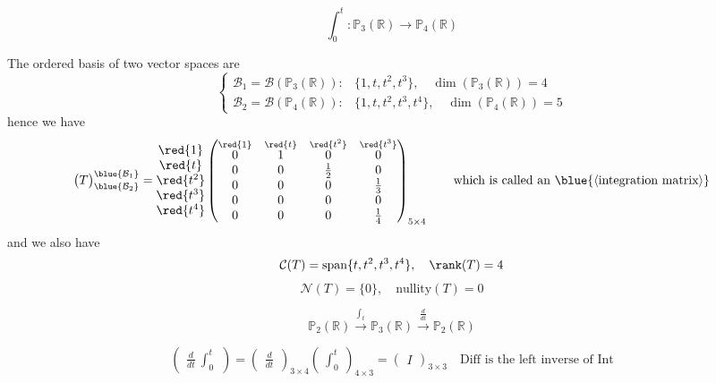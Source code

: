 \begin{eg}
    \[
        \int_0^t: \mathbb{P}_3(\mathbb{R}) \to \mathbb{P}_4(\mathbb{R})
    \]
\end{eg}
The ordered basis of two vector spaces are
\[
    \begin{cases}
        \mathcal{B}_1 = \mathcal{B}(\mathbb{P}_3(\mathbb{R})): & \{1, t, t^2, t^3\}, \quad \dim(\mathbb{P}_3(\mathbb{R})) = 4 \\
        \mathcal{B}_2 = \mathcal{B}(\mathbb{P}_4(\mathbb{R})): & \{1, t, t^2, t^3, t^4\}, \quad \dim(\mathbb{P}_4(\mathbb{R})) = 5
    \end{cases}
\]
hence we have
\[
    \begin{pmatrix}
        T
    \end{pmatrix}_{\blue{\mathcal{B}_2}}^{\blue{\mathcal{B}_1}} = \begin{matrix} 
        \red{1} \\ \red{t} \\ \red{t^2} \\ \red{t^3} \\ \red{t^4}
    \end{matrix}
    \begin{pmatrix}
        \overset{\red{1}}{0} & \overset{\red{t}}{1} & \overset{\red{t^2}}{0} & \overset{\red{t^3}}{0} \\
        0 & 0 & \frac{1}{2} & 0 \\
        0 & 0 & 0 & \frac{1}{3} \\
        0 & 0 & 0 & 0 \\
        0 & 0 & 0 & \frac{1}{4}
    \end{pmatrix}_{5 \times 4} \quad \quad \text{which is called an } \blue{\langle \text{integration matrix} \rangle}
\]
and we also have
\[
    \mathcal{C}(T) = \text{span}\{t, t^2, t^3, t^4\}, \quad \rank(T) = 4
\]
\[
    \mathcal{N}(T) = \{0\}, \quad \text{nullity}(T) = 0
\]

\begin{eg}
    \[
        \mathbb{P}_2(\mathbb{R}) \xrightarrow{\int_t} \mathbb{P}_3(\mathbb{R}) \xrightarrow{\frac{d}{dt}} \mathbb{P}_2(\mathbb{R})
    \]
\end{eg}

\[
\begin{pmatrix}
    \frac{d}{dt} \ \int_0^t
\end{pmatrix} = \begin{pmatrix}
    \frac{d}{dt}
\end{pmatrix}_{3 \times 4} \begin{pmatrix}
    \int_0^t
\end{pmatrix}_{4 \times 3} = \begin{pmatrix}
    I 
\end{pmatrix}_{3 \times 3} \quad \text{Diff is the left inverse of Int}
\]

